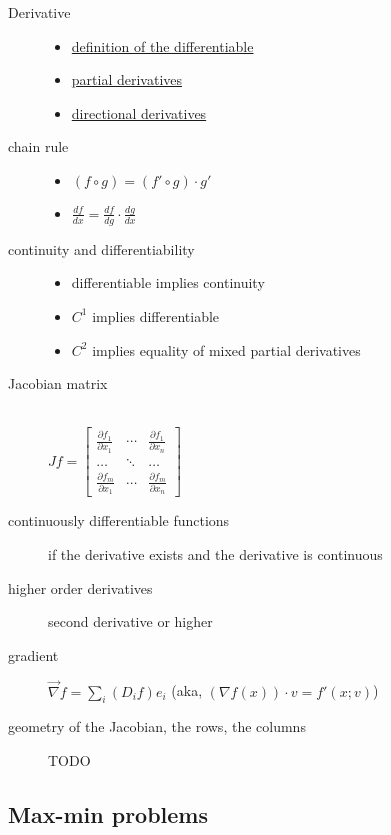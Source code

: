 \begin{description}
\item[Derivative]\hfill
	\begin{itemize}
		\item \hyperref[def:differentiable]{definition of the differentiable}
		\item \hyperref[def:partial_derivative]{partial derivatives}
		\item \hyperref[def:directional_derivative]{directional derivatives}
	\end{itemize}
\item[chain rule]\hfill
	\begin{itemize}
	\item$(f\circ g) = (f' \circ g)\cdot g'$
	\item$\frac{d f}{d x} = \frac{d f}{d g}\cdot \frac{d g}{d x}$
	\end{itemize}
\item[continuity and differentiability]\hfill
	\begin{itemize}
	\item differentiable implies continuity
	\item $C^1$ implies differentiable
	\item $C^2$ implies equality of mixed partial derivatives
	\end{itemize}
\item[Jacobian matrix]\hfill\\
	$
	Jf = \begin{bmatrix}
	  \frac{\partial f_1}{\partial x_1} & \cdots & \frac{\partial f_1}{\partial x_n}\\
	  \ldots & \ddots & \ldots \\
	  \frac{\partial f_m}{\partial x_1} & \cdots & \frac{\partial f_m}{\partial x_n}
	 \end{bmatrix}
	$
\item[continuously differentiable functions]
	if the derivative exists and the derivative is continuous
\item[higher order derivatives]
	second derivative or higher
\item[gradient]
	$\vec\nabla f = \sum_i (D_if)e_i$
	(aka, $(\nabla f(x)) \cdot v = f'(x;v)$)
\item[geometry of the Jacobian, the rows, the columns]TODO
\end{description}


\subsection{Max-min problems}

